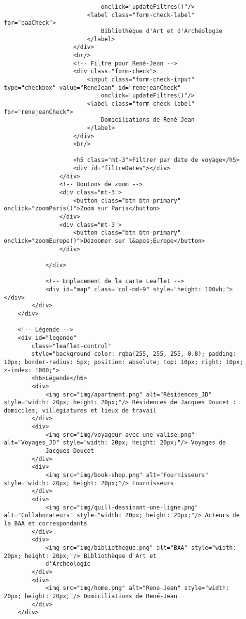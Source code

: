 \begin{verbatim}
                            onclick="updateFiltres()"/>
                        <label class="form-check-label" for="baaCheck">
                            Bibliothèque d'Art et d'Archéologie
                        </label>
                    </div>
                    <br/>
                    <!-- Filtre pour René-Jean -->
                    <div class="form-check">
                        <input class="form-check-input" type="checkbox" value="ReneJean" id="renejeanCheck"
                            onclick="updateFiltres()"/>
                        <label class="form-check-label" for="renejeanCheck">
                            Domiciliations de René-Jean
                        </label>
                    </div>
                    <br/>

                    <h5 class="mt-3">Filtrer par date de voyage</h5>
                    <div id="filtreDates"></div>
                </div>
                <!-- Boutons de zoom -->
                <div class="mt-3">
                    <button class="btn btn-primary" onclick="zoomParis()">Zoom sur Paris</button>
                </div>
                <div class="mt-3">
                    <button class="btn btn-primary" onclick="zoomEurope()">Dézoomer sur l&apos;Europe</button>
                </div>

            </div>

            <!-- Emplacement de la carte Leaflet -->
            <div id="map" class="col-md-9" style="height: 100vh;"></div>            
        </div>
    </div>

    <!-- Légende -->
    <div id="legende" 
        class="leaflet-control"
        style="background-color: rgba(255, 255, 255, 0.8); padding: 10px; border-radius: 5px; position: absolute; top: 10px; right: 10px; z-index: 1000;">
        <h6>Légende</h6>
        <div>
            <img src="img/apartment.png" alt="Résidences_JD" style="width: 20px; height: 20px;"/> Résidences de Jacques Doucet : domiciles, villégiatures et lieux de travail
        </div>
        <div>
            <img src="img/voyageur-avec-une-valise.png" alt="Voyages_JD" style="width: 20px; height: 20px;"/> Voyages de
            Jacques Doucet
        </div>
        <div>
            <img src="img/book-shop.png" alt="Fournisseurs" style="width: 20px; height: 20px;"/> Fournisseurs
        </div>
        <div>
            <img src="img/quill-dessinant-une-ligne.png" alt="Collaborateurs" style="width: 20px; height: 20px;"/> Acteurs de la BAA et correspondants
        </div>
        <div>
            <img src="img/bibliotheque.png" alt="BAA" style="width: 20px; height: 20px;"/> Bibliothèque d'Art et
            d'Archéologie
        </div>
        <div>
            <img src="img/home.png" alt="Rene-Jean" style="width: 20px; height: 20px;"/> Domiciliations de René-Jean
        </div>
    </div>


\end{verbatim}
